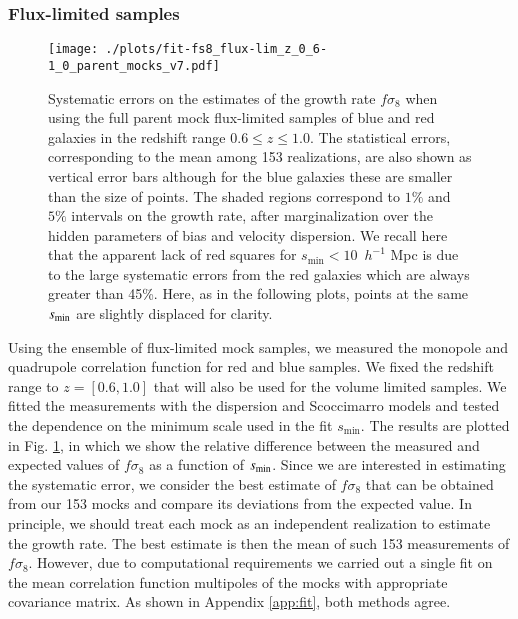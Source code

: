 \documentclass[longauth]{aa}
\newcommand{\hmpc}{$\,h^{-1}$ Mpc\xspace}
\begin{document}
\subsubsection{Flux-limited samples}	\label{sec:fit_flux_ideal}
	\begin{figure}
    	\centering
		\texttt{[image: ./plots/fit-fs8\_flux-lim\_z\_0\_6-1\_0\_parent\_mocks\_v7.pdf]}
		\caption{Systematic errors on the estimates of the growth rate $f\sigma_8$ when using the full parent mock flux-limited samples of blue and red galaxies in the redshift range $0.6\le z\le1.0$. The statistical errors, corresponding to the mean among 153 realizations, are also shown as vertical error bars although for the blue galaxies these are smaller than the size of points. The shaded regions correspond to $1\%$ and $5\%$ intervals on the growth rate, after marginalization over the hidden parameters of bias and velocity dispersion. We recall here that the apparent lack of red squares for $s_{\mathrm{min}}<10$ \hmpc is due to the large systematic errors from the red galaxies which are always greater than 45\%. Here, as in the following plots, points at the same $s_{\rm{min}}$ are slightly displaced for clarity.}\label{fig:flux-lim_syst_ideal_z_0.6-1.0}
	\end{figure}
Using the ensemble of flux-limited mock samples, we measured the monopole and quadrupole correlation function for red and blue samples.  We fixed the redshift range to $z=[0.6,1.0]$ that will also be used for the volume limited samples.  We fitted the measurements with the dispersion and Scoccimarro models and tested the dependence on the minimum scale used in the fit $s_{\mathrm{min}}$. The results are plotted in Fig. \ref{fig:flux-lim_syst_ideal_z_0.6-1.0}, in which we show the relative difference between the measured and expected values of $f\sigma_8$ as a function of $s_{\rm{min}}$. Since we are interested in estimating the systematic error, we consider the best estimate of $f\sigma_8$ that can be obtained from our 153 mocks and compare its deviations from the expected value. In principle, we should treat each mock as an independent realization to estimate the growth rate. The best estimate is then the mean of such 153 measurements of $f\sigma_8$. However, due to computational requirements we carried out a single fit on the mean correlation function multipoles of the mocks with appropriate covariance matrix.  As shown in Appendix \ref{app:fit}, both methods agree.
\end{document}

